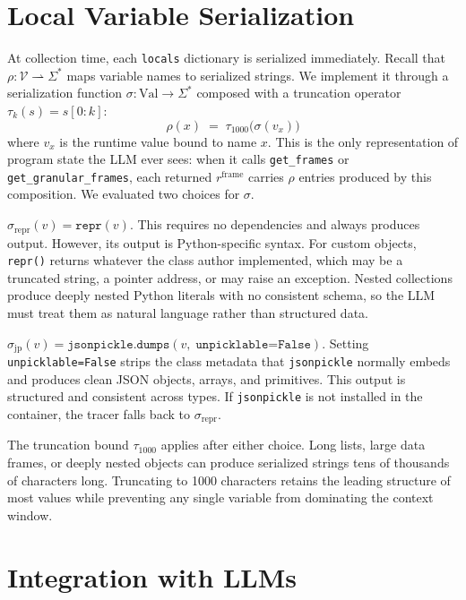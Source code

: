 \section{Local Variable Serialization}
\label{sec:serialization}

At collection time, each \texttt{locals} dictionary is serialized immediately. Recall that $\rho : \mathcal{V} \rightharpoonup \Sigma^{*}$ maps variable names to serialized strings. We implement it through a serialization function $\sigma : \mathrm{Val} \to \Sigma^{*}$ composed with a truncation operator $\tau_k(s) = s[0:k]$:
\[
  \rho(x) \;=\; \tau_{1000}\!\bigl(\sigma(v_x)\bigr)
\]
where $v_x$ is the runtime value bound to name $x$. This is the only representation of program state the LLM ever sees: when it calls \texttt{get\_frames} or \texttt{get\_granular\_frames}, each returned $r^{\mathrm{frame}}$ carries $\rho$ entries produced by this composition. We evaluated two choices for $\sigma$.

\medskip
$\sigma_{\mathrm{repr}}(v) = \texttt{repr}(v)$. This requires no dependencies and always produces output. However, its output is Python-specific syntax. For custom objects, \texttt{repr()} returns whatever the class author implemented, which may be a truncated string, a pointer address, or may raise an exception. Nested collections produce deeply nested Python literals with no consistent schema, so the LLM must treat them as natural language rather than structured data.

\medskip
$\sigma_{\mathrm{jp}}(v) = \texttt{jsonpickle.dumps}(v,\; \texttt{unpicklable=False})$. Setting \texttt{unpicklable=False} strips the class metadata that \texttt{jsonpickle} normally embeds and produces clean JSON objects, arrays, and primitives. This output is structured and consistent across types. If \texttt{jsonpickle} is not installed in the container, the tracer falls back to $\sigma_{\mathrm{repr}}$.

\medskip
The truncation bound $\tau_{1000}$ applies after either choice. Long lists, large data frames, or deeply nested objects can produce serialized strings tens of thousands of characters long. Truncating to 1000 characters retains the leading structure of most values while preventing any single variable from dominating the context window.


\section{Integration with LLMs}
\label{sec:llm-integration}

